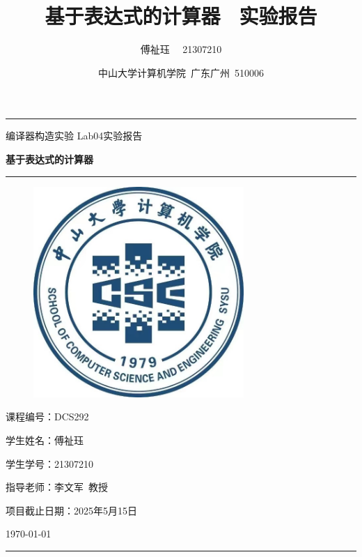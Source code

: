 \documentclass[a4paper, twoside, utf8]{ctexart}
\title{\songti \bfseries 基于表达式的计算器 \ 实验报告}
\author{\fangsong 傅祉珏 \ \ 21307210}
\date{\fangsong 中山大学计算机学院\ 广东广州\ 510006}
\begin{document}
	
	\begin{titlepage}
		\centering
		\rule{\textwidth}{1pt}
		\vspace{0.02\textheight}
		
		{\LARGE \kaishu 编译器构造实验 \quad Lab04实验报告}
		
		\vspace{0.02\textheight}
		
		{\Huge \songti \bfseries 基于表达式的计算器}
		
        \vspace{0.025\textheight}
        \rule{0.83\textwidth}{0.4pt}
        \vspace{0.05\textheight} 
        
        \begin{figure}[htbp]
            \centering
            \includegraphics[width=8cm, height=8cm]{./figure/计院院徽.jpg}
        \end{figure}

        \vspace{0.05\textheight} 
        {\Large 课程编号：\textsc{DCS292}}

        \vspace{0.025\textheight} 
        {\Large 学生姓名：\textsc{傅祉珏}}

        \vspace{0.025\textheight} 
        {\Large 学生学号：\textsc{21307210}}

        \vspace{0.025\textheight} 
        {\Large 指导老师：\textsc{李文军\ 教授}}
 
        \vspace{0.025\textheight} 
        {\Large 项目截止日期：\textsc{2025年5月15日}}

        \vspace{0.05\textheight} 
        \vfill

        {\large \today}
        \vspace{0.1\textheight}
        \rule{\textwidth}{1pt}
    \end{titlepage}
	
\end{document}
